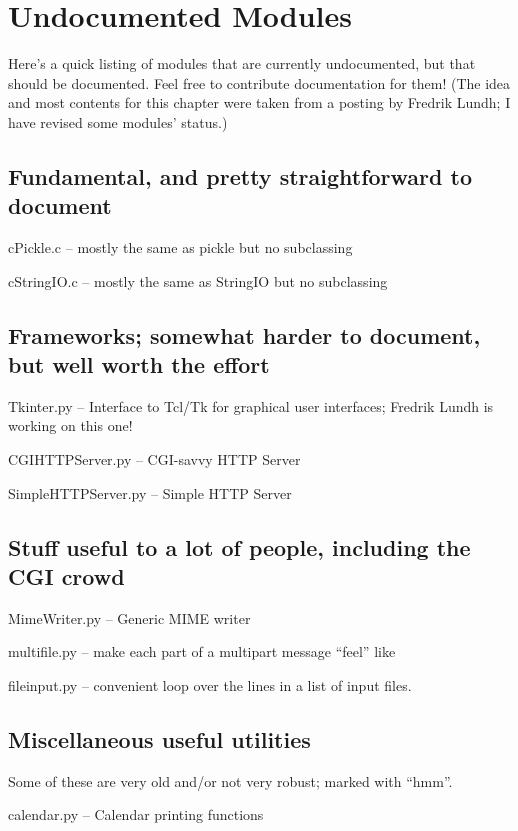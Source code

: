 \chapter{Undocumented Modules}

Here's a quick listing of modules that are currently undocumented, but
that should be documented.  Feel free to contribute documentation for
them!  (The idea and most contents for this chapter were taken from a
posting by Fredrik Lundh; I have revised some modules' status.)


\section{Fundamental, and pretty straightforward to document}

cPickle.c -- mostly the same as pickle but no subclassing

cStringIO.c -- mostly the same as StringIO but no subclassing


\section{Frameworks; somewhat harder to document, but well worth the effort}

Tkinter.py -- Interface to Tcl/Tk for graphical user interfaces;
Fredrik Lundh is working on this one!

CGIHTTPServer.py -- CGI-savvy HTTP Server

SimpleHTTPServer.py -- Simple HTTP Server


\section{Stuff useful to a lot of people, including the CGI crowd}

MimeWriter.py -- Generic MIME writer

multifile.py -- make each part of a multipart message ``feel'' like

fileinput.py -- convenient loop over the lines in a list of input files.


\section{Miscellaneous useful utilities}

Some of these are very old and/or not very robust; marked with ``hmm''.

calendar.py -- Calendar printing functions


